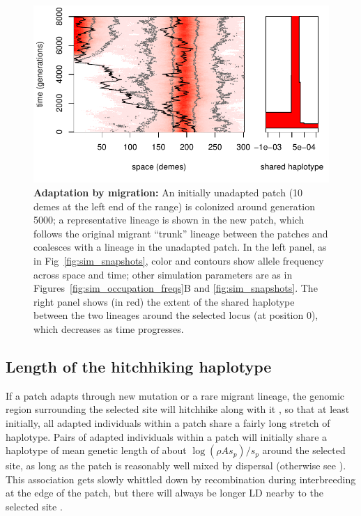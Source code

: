 \documentclass{article}
\newcommand{\citep}[1]{\cite{#1}}
\newcommand{\citet}[1]{\cite{#1}}
\begin{document}
\begin{figure}[ht]
  \begin{center}
      \includegraphics{sim-transit}
  \end{center}
  \caption{
  \textbf{Adaptation by migration:}
  An initially unadapted patch (10 demes at the left end of the range) is colonized around generation 5000;
  a representative lineage is shown in the new patch, which follows the original migrant ``trunk'' lineage
  between the patches and coalesces with a lineage in the unadapted patch.
  In the left panel, as in Fig~\ref{fig:sim_snapshots}, color and contours show allele frequency across space and time;
  other simulation parameters are as in Figures~\ref{fig:sim_occupation_freqs}B and \ref{fig:sim_snapshots}.
  The right panel shows (in red) the extent of the shared haplotype between the two lineages around the selected locus (at position 0),
  which decreases as time progresses. 
  \label{fig:lineagesmotion}
  }
\end{figure}




\subsection[Haplotypes Shared Between Patches]{Length of the hitchhiking haplotype}
\label{ss:haplotype_length}


If a patch adapts through new mutation or a rare migrant lineage, the
genomic region surrounding the selected site will hitchhike along with it \citep{maynardsmith1974hitchhiking},
so that at least initially, all adapted individuals within a patch
share a fairly long stretch of haplotype. 
Pairs of adapted individuals within a patch will initially share a haplotype of mean genetic length of
about $\log(\rho A s_p)/s_p$ around the selected site, 
as long as the patch is reasonably well mixed by dispersal
(otherwise see \citet{barton2013genetic}).
This association gets slowly whittled down by recombination during interbreeding at the edge of the patch,
but there will always be longer LD nearby to the selected site \citep{barton1979geneflow}.
\end{document}
